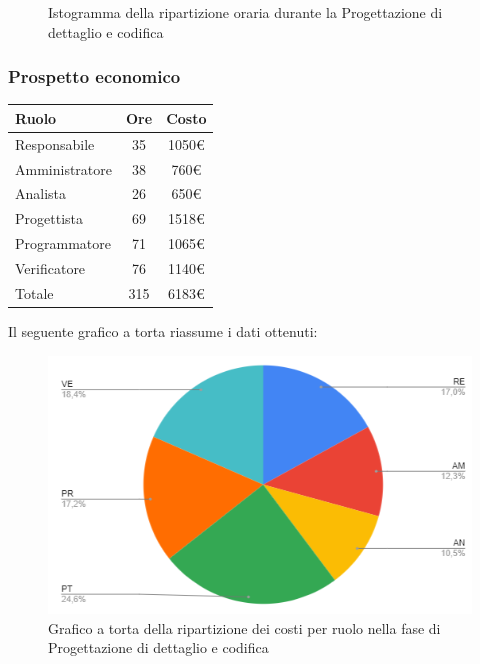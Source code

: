 {{{{{{{{{{{{{{{{\begin{figure}[!h]
\begin{center}
						\caption{Istogramma della ripartizione oraria durante la Progettazione di
							dettaglio e codifica}
					\end{center}
				\end{figure}
				\clearpage
				\subsubsection{Prospetto economico}\label{PreventivoFaseDiProgettazioneDiDettaglioECodificaProspettoEconomico}
				\quad
				\def\tabularxcolumn#1{m{#1}}
				{
					\begin{center}
						\renewcommand{\arraystretch}{1.4}
						\begin{tabularx}{7cm}{|X|c|c|}
							\hline
							\rowcolor{airforceblue}
							\textbf{Ruolo} & \textbf{Ore} & \textbf{Costo}\\
							\hline
							Responsabile & 35 & 1050\euro\\
							\hline
							Amministratore & 38 & 760\euro\\
							\hline
							Analista & 26 & 650\euro\\
							\hline
							Progettista & 69 & 1518\euro\\
							\hline
							Programmatore & 71 & 1065\euro\\
							\hline
							Verificatore & 76 & 1140\euro\\
							\hline
							Totale & 315 & 6183\euro\\
							\hline
						\end{tabularx}
					\end{center}

					Il seguente grafico a torta riassume i dati ottenuti:
					\begin{figure}[!ht]
						\begin{center}
							\includegraphics[width=0.8\linewidth]{../immagini/pdp/torta_progettazione_dettaglio.png}
							\caption{Grafico a torta della ripartizione dei costi per ruolo nella fase di Progettazione
								di dettaglio e codifica}
						\end{center}
					\end{figure}

}}}}}}}}}}}}}}}}}
